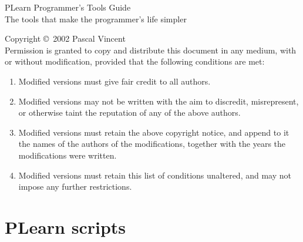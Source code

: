 \documentclass[11pt]{book}
\begin{document}
\thispagestyle{empty}

\thispagestyle{empty}
\begin{center}
{\Huge PLearn Programmer's Tools Guide}\\
\vspace{.5cm}
{\Large The tools that make the programmer's life simpler}\\ 
\vspace{6.5in}
\end{center}
\pagebreak

\vspace*{10cm}


{\small

Copyright \copyright\ 2002 Pascal Vincent \\

Permission is granted to copy and distribute this document in any medium,
with or without modification, provided that the following conditions are
met:

\begin{enumerate}
\item Modified versions must give fair credit to all authors.
\item Modified versions may not be written with the aim to discredit, misrepresent, or otherwise taint the
      reputation of any of the above authors.
\item Modified versions must retain the above copyright notice, and append to
   it the names of the authors of the modifications, together with the years the
   modifications were written.
\item Modified versions must retain this list of conditions unaltered, 
    and may not impose any further restrictions.
\end{enumerate}
}

\pagebreak

\tableofcontents

\cleardoublepage\pagebreak
{}


\chapter{PLearn scripts}

\end{document}
